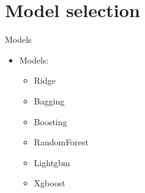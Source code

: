 \documentclass[
 size=14pt,
 paper=smartboard,  %
 mode=present, 		%
 display=slides, 	%
 style=tuliplab,  	%
 pauseslide,
 fleqn,leqno]{powerdot}
\begin{document}






\section{Model selection}

\begin{slide}{Models}
  \begin{itemize}
    \item Models:
      \begin{itemize}
        \item Ridge 
        \item Bagging
        \item Boosting
        \item RandomForest
        \item Lightgbm
        \item Xgboost
      \end{itemize}
  \end{itemize}
\end{slide}
\end{document}
